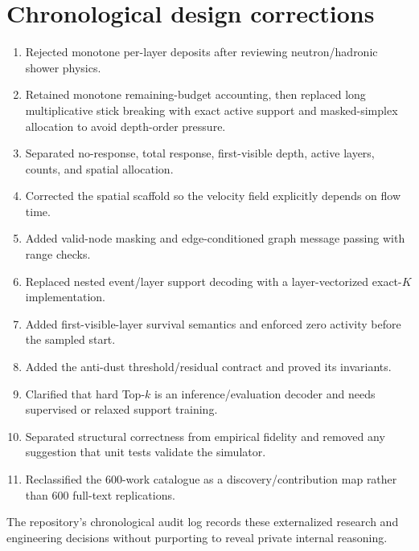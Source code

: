 \documentclass[11pt]{article}
\theoremstyle{definition}
\theoremstyle{remark}
\begin{document}
\section{Chronological design corrections}
\begin{enumerate}[leftmargin=2em]
  \item Rejected monotone per-layer deposits after reviewing neutron/hadronic shower physics.
  \item Retained monotone remaining-budget accounting, then replaced long multiplicative stick breaking with exact active support and masked-simplex allocation to avoid depth-order pressure.
  \item Separated no-response, total response, first-visible depth, active layers, counts, and spatial allocation.
  \item Corrected the spatial scaffold so the velocity field explicitly depends on flow time.
  \item Added valid-node masking and edge-conditioned graph message passing with range checks.
  \item Replaced nested event/layer support decoding with a layer-vectorized exact-$K$ implementation.
  \item Added first-visible-layer survival semantics and enforced zero activity before the sampled start.
  \item Added the anti-dust threshold/residual contract and proved its invariants.
  \item Clarified that hard Top-$k$ is an inference/evaluation decoder and needs supervised or relaxed support training.
  \item Separated structural correctness from empirical fidelity and removed any suggestion that unit tests validate the simulator.
  \item Reclassified the 600-work catalogue as a discovery/contribution map rather than 600 full-text replications.
\end{enumerate}
The repository's chronological audit log records these externalized research and engineering decisions without purporting to reveal private internal reasoning.
\end{document}
